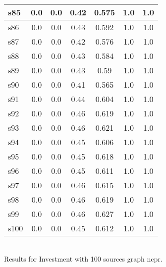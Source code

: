 \documentclass{article}
\begin{document}
\begin{tabular}{|l|c|c|c|c|c|c|}
\hline
s85 &0.0 & 0.0 & 0.42 & 0.575 & 1.0 & 1.0\\
\hline
s86 &0.0 & 0.0 & 0.43 & 0.592 & 1.0 & 1.0\\
\hline
s87 &0.0 & 0.0 & 0.42 & 0.576 & 1.0 & 1.0\\
\hline
s88 &0.0 & 0.0 & 0.43 & 0.584 & 1.0 & 1.0\\
\hline
s89 &0.0 & 0.0 & 0.43 & 0.59 & 1.0 & 1.0\\
\hline
s90 &0.0 & 0.0 & 0.41 & 0.565 & 1.0 & 1.0\\
\hline
s91 &0.0 & 0.0 & 0.44 & 0.604 & 1.0 & 1.0\\
\hline
s92 &0.0 & 0.0 & 0.46 & 0.619 & 1.0 & 1.0\\
\hline
s93 &0.0 & 0.0 & 0.46 & 0.621 & 1.0 & 1.0\\
\hline
s94 &0.0 & 0.0 & 0.45 & 0.606 & 1.0 & 1.0\\
\hline
s95 &0.0 & 0.0 & 0.45 & 0.618 & 1.0 & 1.0\\
\hline
s96 &0.0 & 0.0 & 0.45 & 0.611 & 1.0 & 1.0\\
\hline
s97 &0.0 & 0.0 & 0.46 & 0.615 & 1.0 & 1.0\\
\hline
s98 &0.0 & 0.0 & 0.46 & 0.619 & 1.0 & 1.0\\
\hline
s99 &0.0 & 0.0 & 0.46 & 0.627 & 1.0 & 1.0\\
\hline
s100 &0.0 & 0.0 & 0.45 & 0.612 & 1.0 & 1.0\\
\hline
\end{tabular}\\

\noindent Results for Investment with 100 sources graph ncpr.
\end{document}

